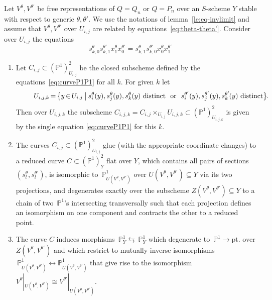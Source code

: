\documentclass[ALCO,ThmDefs,Unicode,epreuves]{cedram}
\def\P{\mathds P}
\newcommand*{\Mk}{\mkern -2mu}
\begin{document}
\begin{prop}\label{prop:curveP1P1}
Let $V^\theta, V^{\theta'}$ be free representations of $Q=Q_n$ or $Q=P_n$ over 
an $S$-scheme $Y$ stable with respect to generic $\theta,\theta'$. 
We use the notations of lemma~\ref{le:eq-invlimit} and assume that 
$V^\theta,V^{\theta'}$ over $U_{i,j}$ are related by equations~\eqref{eq:theta-theta'}.
Consider over $U_{i,j}$ the equations 
\begin{equation}\label{eq:curveP1P1}
s^\theta_{k,0}s^{\theta'}_{k,1}x^\theta_1x^{\theta'}_0
=s^\theta_{k,1}s^{\theta'}_{k,0}x^\theta_0x^{\theta'}_1
\end{equation}

\begin{enumerate}[label=(\alph*)]
\item\label{prop2.16_a} 
Let $C_{i,j}\subset(\P^1)^2_{U_{i,j}}$ be the closed subscheme defined
by the equations~\eqref{eq:curveP1P1} for all $k$. 
For given $k$ let 
\[
\hspace*{\leftmargini}U_{i,j,k}\Mk=\Mk\big\{y\Mk \in \Mk U_{i,j}\mathbin{\big|}
\text{$s^\theta_i(y),s^\theta_j(y),s^\theta_k(y)$ distinct \   or  \ 
$s^{\theta'}_i(y),s^{\theta'}_j(y),s^{\theta'}_k\Mk (y)$ distinct}\big\}\Mk .
\]
Then over $U_{i,j,k}$ the subscheme $C_{i,j,k}=C_{i,j}\times_{U_{i,j}}U_{i,j,k}
\subset(\P^1)^2_{U_{i,j,k}}$ is given by the single equation 
\eqref{eq:curveP1P1} for this $k$. %

\item\label{prop2.16_b} 
The curves $C_{i,j}\subset(\P^1)^2_{U_{i,j}}$ glue (with the appropriate
coordinate changes) to a reduced curve $C\subset(\P^1)^2_Y$ flat over $Y$, 
which contains all pairs of sections $(s^\theta_l,s^{\theta'}_l)$, is isomorphic 
to $\,\P^1_{U(V^\theta,V^{\theta'})}$ over $U(V^\theta,V^{\theta'})\subseteq Y$ 
via its two projections, and degenerates exactly over the subscheme 
$Z(V^\theta,V^{\theta'})\subseteq Y$ to a chain of two $\,\P^1$'s intersecting 
transversally such that each projection defines an isomorphism on one component 
and contracts the other to a reduced point.

\item\label{prop2.16_c} 
The curve $C$ induces morphisms $\,\P^1_Y\leftrightarrows\,\P^1_Y$ 
which degenerate to $\,\P^1\to\text{pt.}$ over $Z(V^\theta,V^{\theta'})$ 
and which restrict to mutually inverse isomorphisms 
$\,\P^1_{U(V^\theta,V^{\theta'})}\!\leftrightarrow\P^1_{U(V^\theta,V^{\theta'})}$ 
that give rise to the isomorphism 
$V^\theta|_{U(V^\theta,V^{\theta'})}\cong V^{\theta'}|_{U(V^\theta,V^{\theta'})}$.
\end{enumerate}
\end{prop}
\end{document}
